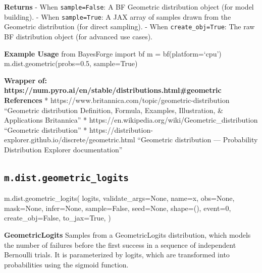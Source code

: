 \documentclass[
  letterpaper,
  DIV=11,
  numbers=noendperiod]{scrartcl}
\newenvironment{Shaded}{\begin{snugshade}}{\end{snugshade}}
\newcommand{\DecValTok}[1]{\textcolor[rgb]{0.68,0.00,0.00}{#1}}
\newcommand{\NormalTok}[1]{\textcolor[rgb]{0.00,0.23,0.31}{#1}}
\newcommand{\OperatorTok}[1]{\textcolor[rgb]{0.37,0.37,0.37}{#1}}
\newcommand{\StringTok}[1]{\textcolor[rgb]{0.13,0.47,0.30}{#1}}
\newcommand{\VariableTok}[1]{\textcolor[rgb]{0.07,0.07,0.07}{#1}}
\begin{document}
\textbf{Returns} - When \texttt{sample=False}: A BF Geometric
distribution object (for model building). - When \texttt{sample=True}: A
JAX array of samples drawn from the Geometric distribution (for direct
sampling). - When \texttt{create\_obj=True}: The raw BF distribution
object (for advanced use cases).

\textbf{Example Usage} from BayesForge import bf m = bf(platform=`cpu')
m.dist.geometric(probs=0.5, sample=True)

\textbf{Wrapper of:
https://num.pyro.ai/en/stable/distributions.html\#geometric}
\textbf{References} *
https://www.britannica.com/topic/geometric-distribution ``Geometric
distribution \textbar{} Definition, Formula, Examples, Illustration, \&
Applications \textbar{} Britannica'' *
https://en.wikipedia.org/wiki/Geometric\_distribution ``Geometric
distribution'' *
https://distribution-explorer.github.io/discrete/geometric.html
``Geometric distribution --- Probability Distribution Explorer
documentation''

\subsection{\texorpdfstring{\texttt{m.dist.geometric\_logits}}{m.dist.geometric\_logits}}\label{geometric_logits}

\begin{Shaded}
\begin{Highlighting}[]
\NormalTok{m.dist.geometric\_logits(}
\NormalTok{    logits,}
\NormalTok{    validate\_args}\OperatorTok{=}\VariableTok{None}\NormalTok{,}
\NormalTok{    name}\OperatorTok{=}\StringTok{\textquotesingle{}x\textquotesingle{}}\NormalTok{,}
\NormalTok{    obs}\OperatorTok{=}\VariableTok{None}\NormalTok{,}
\NormalTok{    mask}\OperatorTok{=}\VariableTok{None}\NormalTok{,}
\NormalTok{    infer}\OperatorTok{=}\VariableTok{None}\NormalTok{,}
\NormalTok{    sample}\OperatorTok{=}\VariableTok{False}\NormalTok{,}
\NormalTok{    seed}\OperatorTok{=}\VariableTok{None}\NormalTok{,}
\NormalTok{    shape}\OperatorTok{=}\NormalTok{(),}
\NormalTok{    event}\OperatorTok{=}\DecValTok{0}\NormalTok{,}
\NormalTok{    create\_obj}\OperatorTok{=}\VariableTok{False}\NormalTok{,}
\NormalTok{    to\_jax}\OperatorTok{=}\VariableTok{True}\NormalTok{,}
\NormalTok{)}
\end{Highlighting}
\end{Shaded}

\textbf{GeometricLogits} Samples from a GeometricLogits distribution,
which models the number of failures before the first success in a
sequence of independent Bernoulli trials. It is parameterized by logits,
which are transformed into probabilities using the sigmoid function.
\end{document}
